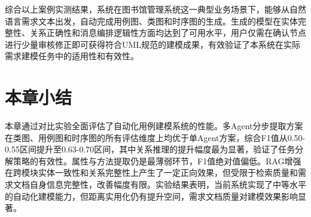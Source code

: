 综合以上案例实测结果，系统在图书馆管理系统这一典型业务场景下，能够从自然语言需求文本出发，自动完成用例图、类图和时序图的生成。生成的模型在实体完整性、关系正确性和消息编排逻辑性方面均达到了可用水平，用户仅需在确认节点进行少量审核修正即可获得符合UML规范的建模成果，有效验证了本系统在实际需求建模任务中的适用性和有效性。

\section{本章小结}

本章通过对比实验全面评估了自动化用例建模系统的性能。多Agent分步提取方案在类图、用例图和时序图的所有评估维度上均优于单Agent方案，综合F1值从0.50-0.55区间提升至0.63-0.70区间，其中关系推理的提升幅度最为显著，验证了任务分解策略的有效性。属性与方法提取仍是最薄弱环节，F1值绝对值偏低。RAG增强在跨模块实体一致性和关系完整性上产生了一定正向效果，但受限于检索质量和需求文档自身信息完整性，改善幅度有限。实验结果表明，当前系统实现了中等水平的自动化建模能力，但距离实用化仍有提升空间，需求文档质量对建模效果影响显著。
